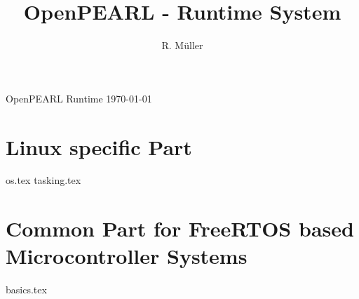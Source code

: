 \documentclass[12pt]{scrbook}
\begin{document}
\title{OpenPEARL - Runtime System}
\author{R. M\"uller}

 {
}%
{}%

 {
}%
{}%

\newenvironment{classSummary}%
{\vspace{3mm}\colorbox{black!15}{\parbox{5cm}{Class Summary}}\\
\begin{tabular}{|p{5cm}|p{9cm}|}
\hline
Item & Value \\
\hline}
{\hline\end{tabular}\vspace{3mm}}

\newenvironment{methodMapping}%
{\vspace{3mm}\colorbox{black!15}{\parbox{5cm}{Method Mapping}}\\
\begin{tabular}{|p{3cm}|p{4cm}|p{6.5cm}|}
\hline
Operation & Method & Remarks\\
\hline}
{\hline\end{tabular}\vspace{3mm}}

\pagestyle{myheadings}
 {OpenPEARL Runtime \today}

\maketitle

\tableofcontents
















\chapter{Linux specific Part}
{os.tex}
{tasking.tex}

\chapter{Common Part for FreeRTOS based Microcontroller Systems}
{basics.tex}
\end{document}
